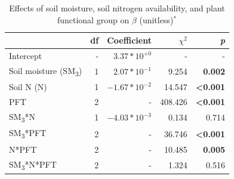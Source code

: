 \newpage
\begin{table}
    \centering
    \caption[Effects of soil moisture, soil nitrogen availability, and plant functional group on $\beta$]{Effects of soil moisture, soil nitrogen availability, and plant functional group on $\beta$ (unitless)$^*$}
        \begin{tabular}{p{3.75cm}p{0.5cm}p{2cm}p{1.5cm}p{1.5cm}}
            \hline 
            & \multicolumn{1}{r}{df} 
            & \multicolumn{1}{r}{Coefficient} 
            & \multicolumn{1}{r}{$\chi^{2}$} 
            & \multicolumn{1}{r}{\textit{p}} 
            \\ 
            \hline
            
            Intercept
            & \multicolumn{1}{r}{-}
            & \multicolumn{1}{r}{$3.37*10^{+0}$}
            & \multicolumn{1}{r}{-}
            & \multicolumn{1}{r}{-}
            \\

            Soil moisture (SM\textsubscript{3})
            & \multicolumn{1}{r}{1}
            & \multicolumn{1}{r}{$2.07*10^{-1}$}
            & \multicolumn{1}{r}{9.254}
            & \multicolumn{1}{r}{\textbf{0.002}}
            \\

            Soil N (N)
            & \multicolumn{1}{r}{1}
            & \multicolumn{1}{r}{$-1.67*10^{-2}$}
            & \multicolumn{1}{r}{14.547}
            & \multicolumn{1}{r}{\textbf{<0.001}}
            \\

            PFT
            & \multicolumn{1}{r}{2}
            & \multicolumn{1}{r}{-}
            & \multicolumn{1}{r}{408.426}
            & \multicolumn{1}{r}{\textbf{<0.001}}
            \\

            SM\textsubscript{3}*N
            & \multicolumn{1}{r}{1}
            & \multicolumn{1}{r}{$-4.03*10^{-3}$}
            & \multicolumn{1}{r}{0.134}
            & \multicolumn{1}{r}{0.714}
            \\

            SM\textsubscript{3}*PFT
            & \multicolumn{1}{r}{2}
            & \multicolumn{1}{r}{-}
            & \multicolumn{1}{r}{36.746}
            & \multicolumn{1}{r}{\textbf{<0.001}}
            \\

            N*PFT
            & \multicolumn{1}{r}{2}
            & \multicolumn{1}{r}{-}
            & \multicolumn{1}{r}{10.485}
            & \multicolumn{1}{r}{\textbf{0.005}}
            \\

            SM\textsubscript{3}*N*PFT
            & \multicolumn{1}{r}{2}
            & \multicolumn{1}{r}{-}
            & \multicolumn{1}{r}{1.324}
            & \multicolumn{1}{r}{0.516}
            \\
            \hline
        \end{tabular}%
    \label{tab:table4.2}
\end{table}
